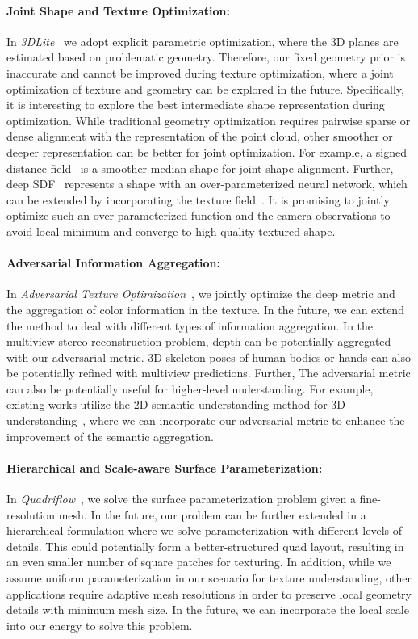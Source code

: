 \paragraph*{Joint Shape and Texture Optimization:} In \emph{3DLite}~\cite{huang20173dlite} we adopt explicit parametric optimization, where the 3D planes are estimated based on problematic geometry. Therefore, our fixed geometry prior is inaccurate and cannot be improved during texture optimization, where a joint optimization of texture and geometry can be explored in the future. Specifically, it is interesting to explore the best intermediate shape representation during optimization. While traditional geometry optimization requires pairwise sparse or dense alignment with the representation of the point cloud, other smoother or deeper representation can be better for joint optimization. For example, a signed distance field~\cite{curless1996volumetric} is a smoother median shape for joint shape alignment. Further, deep SDF~\cite{park2019deepsdf} represents a shape with an over-parameterized neural network, which can be extended by incorporating the texture field~\cite{oechsle2019texture}. It is promising to jointly optimize such an over-parameterized function and the camera observations to avoid local minimum and converge to high-quality textured shape.

\paragraph*{Adversarial Information Aggregation:} In \emph{Adversarial Texture Optimization}~\cite{huang2020adversarial}, we jointly optimize the deep metric and the aggregation of color information in the texture. In the future, we can extend the method to deal with different types of information aggregation. In the multiview stereo reconstruction problem, depth can be potentially aggregated with our adversarial metric. 3D skeleton poses of human bodies or hands can also be potentially refined with multiview predictions. Further, The adversarial metric can also be potentially useful for higher-level understanding. For example, existing works utilize the 2D semantic understanding method for 3D understanding~\cite{dai20183dmv}, where we can incorporate our adversarial metric to enhance the improvement of the semantic aggregation. 

\paragraph*{Hierarchical and Scale-aware Surface Parameterization:} In \emph{Quadriflow}~\cite{huang2018quadriflow}, we solve the surface parameterization problem given a fine-resolution mesh. In the future, our problem can be further extended in a hierarchical formulation where we solve parameterization with different levels of details. This could potentially form a better-structured quad layout, resulting in an even smaller number of square patches for texturing. In addition, while we assume uniform parameterization in our scenario for texture understanding, other applications require adaptive mesh resolutions in order to preserve local geometry details with minimum mesh size. In the future, we can incorporate the local scale into our energy to solve this problem.

